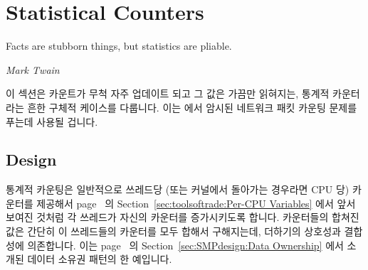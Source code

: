 \section{Statistical Counters}
\label{sec:count:Statistical Counters}
%
\epigraph{Facts are stubborn things, but statistics are pliable.}
	 {\emph{Mark Twain}}

이 섹션은 카운트가 무척 자주 업데이트 되고 그 값은 가끔만 읽혀지는, 통계적
카운터라는 흔한 구체적 케이스를 다룹니다.
이는 \QuickQuizRef{\QcountQstatcnt} 에서 암시된 네트워크 패킷 카운팅 문제를
푸는데 사용될 겁니다.

\subsection{Design}

통계적 카운팅은 일반적으로 쓰레드당 (또는 커널에서 돌아가는 경우라면 CPU 당)
카운터를 제공해서
page~\pageref{sec:toolsoftrade:Per-CPU Variables} 의
Section~\ref{sec:toolsoftrade:Per-CPU Variables}
에서 앞서 보여진 것처럼 각 쓰레드가 자신의 카운터를 증가시키도록 합니다.
카운터들의 합쳐진 값은 간단히 이 쓰레드들의 카운터를 모두 합해서 구해지는데,
더하기의 상호성과 결합성에 의존합니다.
이는
page~\pageref{sec:SMPdesign:Data Ownership} 의
Section~\ref{sec:SMPdesign:Data Ownership}
에서 소개된 데이터 소유권 패턴의 한 예입니다.

